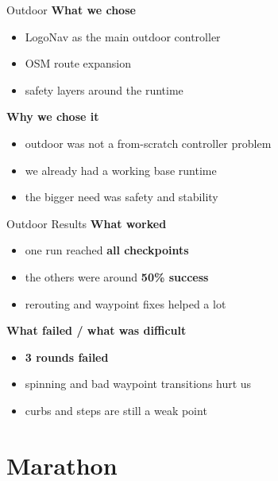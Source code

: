 \documentclass{beamer}
\begin{document}
\begin{frame}{Outdoor}
\textbf{What we chose}
\begin{itemize}
  \item LogoNav as the main outdoor controller
  \item OSM route expansion
  \item safety layers around the runtime
\end{itemize}

\vspace{0.5em}
\textbf{Why we chose it}
\begin{itemize}
  \item outdoor was not a from-scratch controller problem
  \item we already had a working base runtime
  \item the bigger need was safety and stability
\end{itemize}
\end{frame}

\begin{frame}{Outdoor Results}
\textbf{What worked}
\begin{itemize}
  \item one run reached \textbf{all checkpoints}
  \item the others were around \textbf{50\% success}
  \item rerouting and waypoint fixes helped a lot
\end{itemize}

\vspace{0.5em}
\textbf{What failed / what was difficult}
\begin{itemize}
  \item \textbf{3 rounds failed}
  \item spinning and bad waypoint transitions hurt us
  \item curbs and steps are still a weak point
\end{itemize}
\end{frame}

\section{Marathon}
\end{document}
